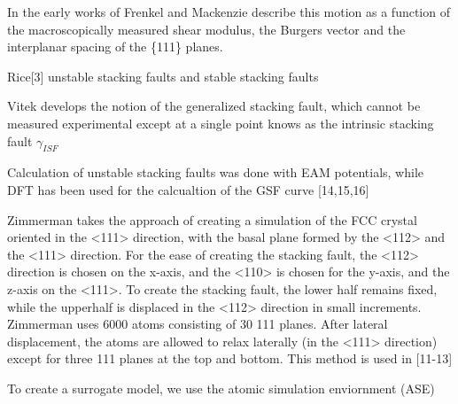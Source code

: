 In the early works of Frenkel and Mackenzie describe this motion as a function of the macroscopically measured shear modulus, the Burgers vector and the interplanar spacing of the \{111\} planes.

Rice[3] unstable stacking faults and stable stacking faults

Vitek\cite{vitek1966_gsf,vitek1968_gsf} develops the notion of the generalized stacking fault, which cannot be measured experimental except at a single point knows as the intrinsic stacking fault $\gamma_{ISF}$

Calculation of unstable stacking faults\cite{sun1990_eam_esf,sun1993_eam_esf,farkas1997_eam_usf} was done with EAM potentials, while DFT has been used for the calcualtion of the GSF curve [14,15,16]

Zimmerman takes the approach of creating a simulation of the FCC crystal oriented in the <111> direction, with the basal plane formed by the <112> and the <111> direction.  For the ease of creating the stacking fault, the <112> direction is chosen on the x-axis, and the <110> is chosen for the y-axis, and the z-axis on the <111>.  To create the stacking fault, the lower half remains fixed, while the upperhalf is displaced in the <112> direction in small increments.  Zimmerman uses 6000 atoms consisting of 30 {111} planes.  After lateral displacement, the atoms are allowed to relax laterally (in the <111> direction) except for three {111} planes at the top and bottom.  This method is used in [11-13]

To create a surrogate model, we use the atomic simulation enviornment (ASE)
